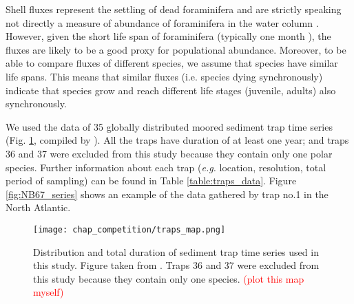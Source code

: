 \documentclass[a4paper]{article}
\begin{document}
Shell fluxes represent the settling of dead foraminifera and are strictly speaking not directly a measure of abundance of foraminifera in the water column \cite{jonkers2015global}. However, given the short life span of foraminifera (typically one month \citep{hemleben1989modern}), the fluxes are likely to be a good proxy for populational abundance. Moreover, to be able to compare fluxes of different species, we assume that species have similar life spans. This means that similar fluxes (i.e. species dying synchronously) indicate that species grow and reach different life stages (juvenile, adults) also synchronously.


We used the data of 35 globally distributed moored sediment trap time series (Fig. \ref{fig:map}, compiled by \citealt{jonkers2015global}). All the traps have duration of at least one year; and traps 36 and 37 were excluded from this study because they contain only one polar species. Further information about each trap (\textit{e.g.} location, resolution, total period of sampling) can be found in Table \ref{table:traps_data}. Figure \ref{fig:NB67_series} shows an example of the data gathered by trap no.1 in the North Atlantic. 

\begin{figure}
\center
\texttt{[image: chap\_competition/traps\_map.png]}
\caption{\label{fig:map} Distribution and total duration of sediment trap time series used in this study. Figure taken from \citep{jonkers2015global}. Traps 36 and 37 were excluded from this study because they contain only one species. \textcolor{red}{(plot this map myself)}}
\end{figure}
\end{document}
